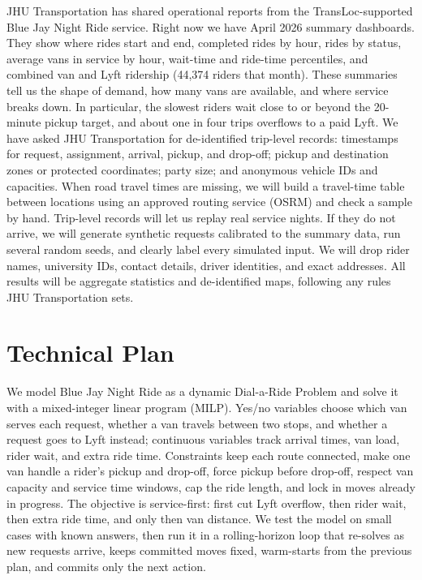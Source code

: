 \documentclass{article}
\begin{document}
JHU Transportation has shared operational reports from the TransLoc-supported Blue Jay Night Ride service. Right now we have April 2026 summary dashboards. They show where rides start and end, completed rides by hour, rides by status, average vans in service by hour, wait-time and ride-time percentiles, and combined van and Lyft ridership (44,374 riders that month). These summaries tell us the shape of demand, how many vans are available, and where service breaks down. In particular, the slowest riders wait close to or beyond the 20-minute pickup target, and about one in four trips overflows to a paid Lyft. We have asked JHU Transportation for de-identified trip-level records: timestamps for request, assignment, arrival, pickup, and drop-off; pickup and destination zones or protected coordinates; party size; and anonymous vehicle IDs and capacities. When road travel times are missing, we will build a travel-time table between locations using an approved routing service (OSRM) and check a sample by hand. Trip-level records will let us replay real service nights. If they do not arrive, we will generate synthetic requests calibrated to the summary data, run several random seeds, and clearly label every simulated input. We will drop rider names, university IDs, contact details, driver identities, and exact addresses. All results will be aggregate statistics and de-identified maps, following any rules JHU Transportation sets.

\vskip -0.1in
\section{Technical Plan}
\vskip -0.1in

We model Blue Jay Night Ride as a dynamic Dial-a-Ride Problem and solve it with a mixed-integer linear program (MILP). Yes/no variables choose which van serves each request, whether a van travels between two stops, and whether a request goes to Lyft instead; continuous variables track arrival times, van load, rider wait, and extra ride time. Constraints keep each route connected, make one van handle a rider's pickup and drop-off, force pickup before drop-off, respect van capacity and service time windows, cap the ride length, and lock in moves already in progress. The objective is service-first: first cut Lyft overflow, then rider wait, then extra ride time, and only then van distance. We test the model on small cases with known answers, then run it in a rolling-horizon loop that re-solves as new requests arrive, keeps committed moves fixed, warm-starts from the previous plan, and commits only the next action.
\end{document}
